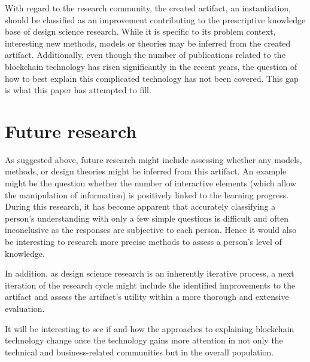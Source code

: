 With regard to the research community, the created artifact, an instantiation, should be classified as an improvement contributing to the prescriptive knowledge base of design science research. While it is specific to its problem context, interesting new methods, models or theories may be inferred from the created artifact. Additionally, even though the number of publications related to the blockchain technology has risen significantly in the recent years, the question of how to best explain this complicated technology has not been covered. This gap is what this paper has attempted to fill.

\section{Future research} \label{sec:FutureResearch}
As suggested above, future research might include assessing whether any models, methods, or design theories might be inferred from this artifact. An example might be the question whether the number of interactive elements (which allow the manipulation of information) is positively linked to the learning progress. During this research, it has become apparent that accurately classifying a person's understanding with only a few simple questions is difficult and often inconclusive as the responses are subjective to each person. Hence it would also be interesting to research more precise methods to assess a person's level of knowledge.

In addition, as design science research is an inherently iterative process, a next iteration of the research cycle might include the identified improvements to the artifact and assess the artifact's utility within a more thorough and extensive evaluation.

It will be interesting to see if and how the approaches to explaining blockchain technology change once the technology gains more attention in not only the technical and business-related communities but in the overall population.